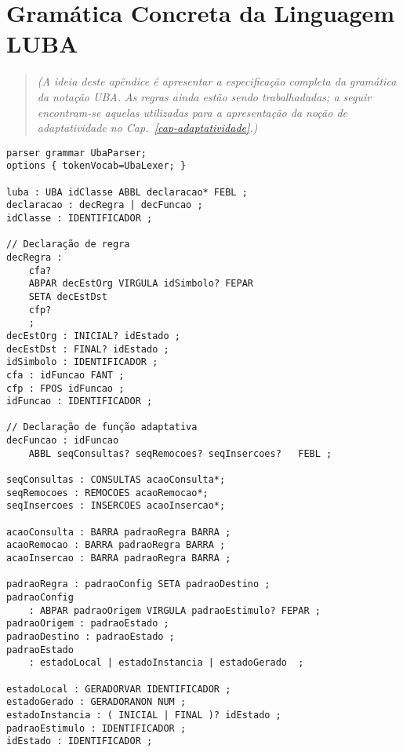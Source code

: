 
\chapter{Gramática Concreta da Linguagem LUBA}
\label{cap:isv:gramatica} %

\begin{quote}
\textit{(A ideia deste apêndice é apresentar a especificação completa da gramática da notação UBA. As regras ainda estão sendo trabalhadadas; a seguir encontram-se aquelas utilizadas para a apresentação da noção de adaptatividade no Cap.~\ref{cap-adaptatividade}.)}
\end{quote}

\begin{lstlisting}[style=antlr]
parser grammar UbaParser;
options { tokenVocab=UbaLexer; }

luba : UBA idClasse ABBL declaracao* FEBL ;
declaracao : decRegra | decFuncao ;
idClasse : IDENTIFICADOR ;

// Declaração de regra
decRegra :
	cfa?
	ABPAR decEstOrg VIRGULA idSimbolo? FEPAR
	SETA decEstDst
	cfp?
	;
decEstOrg : INICIAL? idEstado ;
decEstDst : FINAL? idEstado ;
idSimbolo : IDENTIFICADOR ;
cfa : idFuncao FANT ;
cfp : FPOS idFuncao ;
idFuncao : IDENTIFICADOR ;

// Declaração de função adaptativa
decFuncao : idFuncao
	ABBL seqConsultas? seqRemocoes? seqInsercoes? 	FEBL ;
	
seqConsultas : CONSULTAS acaoConsulta*;
seqRemocoes : REMOCOES acaoRemocao*;
seqInsercoes : INSERCOES acaoInsercao*;

acaoConsulta : BARRA padraoRegra BARRA ;
acaoRemocao : BARRA padraoRegra BARRA ;
acaoInsercao : BARRA padraoRegra BARRA ;

padraoRegra : padraoConfig SETA padraoDestino ;
padraoConfig
	: ABPAR padraoOrigem VIRGULA padraoEstimulo? FEPAR ;
padraoOrigem : padraoEstado ;
padraoDestino : padraoEstado ;
padraoEstado
	: estadoLocal | estadoInstancia | estadoGerado  ;

estadoLocal : GERADORVAR IDENTIFICADOR ;
estadoGerado : GERADORANON NUM ;
estadoInstancia : ( INICIAL | FINAL )? idEstado ;
padraoEstimulo : IDENTIFICADOR ;
idEstado : IDENTIFICADOR ;
\end{lstlisting}
